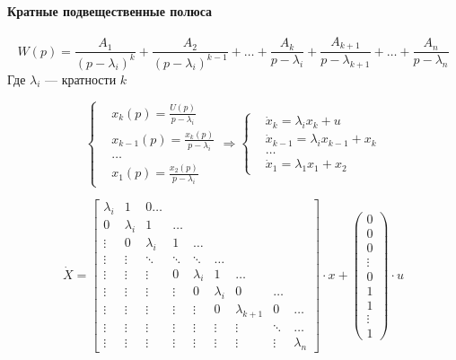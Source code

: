 \paragraph{Кратные подвещественные полюса}\mbox{}\par
\[W(p) = \frac{A_1}{(p-\lambda_i)^k} + \frac{A_2}{(p-\lambda_i)^{k-1}} + \ldots
+ \frac{A_k}{p - \lambda_i} + \frac{A_{k+1}}{p - \lambda_{k+1}} + \ldots +
\frac{A_n}{p-\lambda_n}\]
Где $\lambda_i$ --- кратности $k$

\[\left\{\begin{aligned} &x_k(p) = \frac{U(p)}{p-\lambda_i}\\
												 &x_{k-1}(p) = \frac{x_k(p)}{p-\lambda_i}\\
												 &\hdots\\
												 &x_1(p) = \frac{x_2(p)}{p-\lambda_i}
	\end{aligned}\right. \Longrightarrow \left\{\begin{aligned}
												 &\dot x_k = \lambda_i x_k + u \\
												 &\dot x_{k-1} = \lambda_i x_{k-1} + x_k\\
												 &\hdots\\
												 &\dot x_1 = \lambda_1 x_1 + x_2
\end{aligned} \right.\]

		\[\dot X = \begin{bmatrix} \lambda_i & 1 & 0 \hdots \\
			0 & \lambda_i & 1 & \hdots \\
			\vdots & 0 & \lambda_i & 1 & \hdots\\
			\vdots & \vdots & \ddots & \ddots & \ddots &\hdots\\
			\vdots & \vdots & \vdots & 0 & \lambda_i & 1 & \hdots\\
			\vdots & \vdots & \vdots & \vdots & 0 & \lambda_i & 0 & \hdots\\
			\vdots & \vdots & \vdots & \vdots & \vdots & 0 & \lambda_{k+1} & 0
						 &\hdots\\
			\vdots & \vdots & \vdots & \vdots & \vdots & \vdots & \vdots & \ddots
						 &\hdots\\
			\vdots & \vdots & \vdots & \vdots & \vdots & \vdots & \vdots & \vdots &
			\lambda_n
			\end{bmatrix} \cdot x + \begin{pmatrix} 0 \\ 0 \\ 0 \\ \vdots\\ 0\\ 1\\
			1\\ \vdots \\ 1
		\end{pmatrix} \cdot u\]

